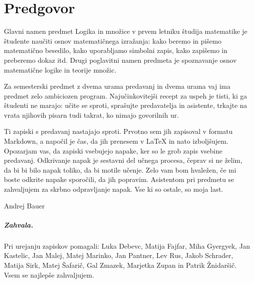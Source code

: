 \chapter{Predgovor}
\label{chap:predgovor}

Glavni namen predmet Logika in množice v prvem letniku študija matematike je študente
naučiti osnov matematičnega izražanja: kako beremo in pišemo matematično besedilo, kako
uporabljamo simbolni zapis, kako zapišemo in preberemo dokaz itd. Drugi poglavitni namen
predmeta je spoznavanje osnov matematične logike in teorije množic.

Za semesterski predmet z dvema urama predavanj in dvema urama vaj ima predmet zelo
ambiciozen program. Najučinkovitejši recept za uspeh je tisti, ki ga študenti ne marajo:
učite se sproti, sprašujte predavatelja in asistente, trkajte na vrata njihovih pisarn
tudi takrat, ko nimajo govorilnih ur.

Ti zapiski s predavanj nastajajo sproti. Prvotno sem jih zapisoval v formatu Markdown, a napočil je čas, da jih prenesem v {\LaTeX} in nato izboljšujem. Opozarjam vas, da zapiski vsebujejo napake, ker so le grob zapis vsebine predavanj. Odkrivanje napak je sestavni del učnega procesa, čeprav si ne želim, da bi bi bilo napak toliko, da bi motile učenje. Zelo vam bom hvaležen, če mi boste odkrite napake sporočili, da jih popravim. Asistentom pri predmetu se zahvaljujem za skrbno odpravljanje napak. Vse ki so ostale, so moja last.

\bigskip

\begin{flushright}
Andrej Bauer \qquad\hbox{}
\end{flushright}

\bigskip

\paragraph{Zahvala.}
%
Pri urejanju zapiskov pomagali:
%
Luka Debevc,
Matija Fajfar,
Miha Gyergyek,
Jan Kastelic,
Jan Malej,
Matej Marinko,
Jan Pantner,
Lev Rus,
Jakob Schrader,
Matija Sirk,
Matej Šafarič,
Gal Zmazek,
Marjetka Zupan in Patrik Žnidaršič.
%
Vsem se najlepše zahvaljujem.


